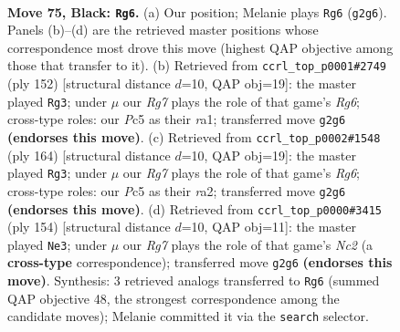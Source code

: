\documentclass[11pt]{article}
\begin{document}
\clearpage

\begin{figure}[p]\centering
\begin{subfigure}{0.46\textwidth}\centering
\resizebox{\linewidth}{!}{%
\newchessgame
\chessboard[
  setfen={8/4k3/8/2pp4/p7/8/6r1/5K2 b - - 7 75},
  showmover=false,
  pgfstyle=straightmove, color=movearrow, markmove={g2-g6}
]}
\caption{}
\end{subfigure}\hfill
\begin{subfigure}{0.46\textwidth}\centering
\resizebox{\linewidth}{!}{%
\newchessgame
\chessboard[
  setfen={8/5k2/6R1/7P/5P1K/8/8/r7 w - - 5 77},
  showmover=false,
  pgfstyle=straightmove, color=movearrow, markmove={g6-g3}
]}
\caption{}
\end{subfigure}
\\[4pt]
\begin{subfigure}{0.46\textwidth}\centering
\resizebox{\linewidth}{!}{%
\newchessgame
\chessboard[
  setfen={8/5k2/6R1/7P/5P1K/8/r7/8 w - - 9 83},
  showmover=false,
  pgfstyle=straightmove, color=movearrow, markmove={g6-g3}
]}
\caption{}
\end{subfigure}\hfill
\begin{subfigure}{0.46\textwidth}\centering
\resizebox{\linewidth}{!}{%
\newchessgame
\chessboard[
  setfen={8/4n3/8/4P1P1/8/2k2K1p/2N5/8 w - - 2 78},
  showmover=false,
  pgfstyle=straightmove, color=movearrow, markmove={c2-e3}
]}
\caption{}
\end{subfigure}
\caption{\textbf{Move 75, Black: \texttt{Rg6}.} (a) Our position; Melanie plays \texttt{Rg6} (\texttt{g2g6}). Panels (b)--(d) are the retrieved master positions whose correspondence most drove this move (highest QAP objective among those that transfer to it). (b) Retrieved from \texttt{ccrl\_top\_p0001\#2749} (ply 152) [structural distance $d$=10, QAP obj=19]: the master played \texttt{Rg3}; under $\mu$ our \emph{Rg7} plays the role of that game's \emph{Rg6}; cross-type roles: our \emph{P}c5 as their \emph{r}a1; transferred move \texttt{g2g6} \textbf{(endorses this move)}. (c) Retrieved from \texttt{ccrl\_top\_p0002\#1548} (ply 164) [structural distance $d$=10, QAP obj=19]: the master played \texttt{Rg3}; under $\mu$ our \emph{Rg7} plays the role of that game's \emph{Rg6}; cross-type roles: our \emph{P}c5 as their \emph{r}a2; transferred move \texttt{g2g6} \textbf{(endorses this move)}. (d) Retrieved from \texttt{ccrl\_top\_p0000\#3415} (ply 154) [structural distance $d$=10, QAP obj=11]: the master played \texttt{Ne3}; under $\mu$ our \emph{Rg7} plays the role of that game's \emph{Nc2} (a \textbf{cross-type} correspondence); transferred move \texttt{g2g6} \textbf{(endorses this move)}. Synthesis: 3 retrieved analogs transferred to \texttt{Rg6} (summed QAP objective 48, the strongest correspondence among the candidate moves); Melanie committed it via the \texttt{search} selector.}
\label{fig:thought-m149}
\end{figure}
\end{document}

